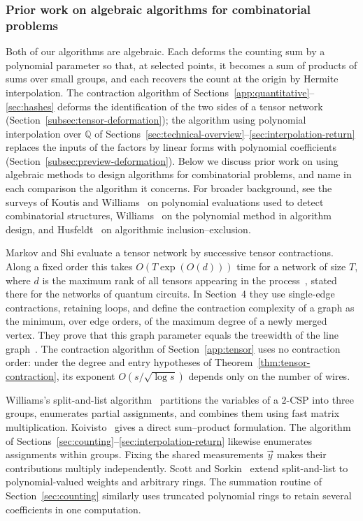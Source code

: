 \documentclass[11pt,reqno]{amsart}
\numberwithin{equation}{section}
\theoremstyle{definition}\newtheorem{definition}[theorem]{Definition}
\theoremstyle{remark}\newtheorem{remark}[theorem]{Remark}
\begin{document}
\subsubsection{Prior work on algebraic algorithms for combinatorial problems}\label{subsec:related-algebraic}
Both of our algorithms are algebraic. Each deforms the counting sum by
a polynomial parameter so that, at selected points, it becomes a sum of
products of sums over small groups, and each recovers the count at the
origin by Hermite interpolation. The contraction algorithm of
Sections~\ref{app:quantitative}--\ref{sec:hashes} deforms the
identification of the two sides of a tensor network
(Section~\ref{subsec:tensor-deformation}); the algorithm using polynomial interpolation over $\mathbb Q$ of
Sections~\ref{sec:technical-overview}--\ref{sec:interpolation-return}
replaces the inputs of the factors by linear forms with polynomial
coefficients (Section~\ref{subsec:preview-deformation}). Below we
discuss prior work on using algebraic methods to design algorithms for
combinatorial problems, and name in each comparison the algorithm it
concerns. For broader background, see the surveys of Koutis and
Williams~\cite{KW16} on polynomial evaluations used to detect combinatorial structures, Williams~\cite{Wil14}
on the polynomial method in algorithm design, and
Husfeldt~\cite{Hus11} on algorithmic inclusion--exclusion.

Markov and Shi evaluate a tensor network by successive tensor
contractions. Along a fixed order this takes $O(T\exp(O(d)))$ time
for a network of size $T$, where $d$ is the maximum rank of all
tensors appearing in the process~\cite[Proposition~3.6]{MS08}, stated
there for the networks of quantum circuits. In Section~4 they use
single-edge contractions, retaining loops, and define the contraction
complexity of a graph as the minimum, over edge orders, of the maximum
degree of a newly merged vertex. They prove that this graph parameter
equals the treewidth of the line graph~\cite[Definition~4.1 and
Proposition~4.2]{MS08}. The contraction algorithm of
Section~\ref{app:tensor} uses no contraction order: under
the degree and entry hypotheses of Theorem~\ref{thm:tensor-contraction},
its exponent $O(s/\sqrt{\log s})$ depends only on the number of wires.

Williams's split-and-list algorithm~\cite{Wil05} partitions the
variables of a $2$-CSP into three groups, enumerates partial assignments,
and combines them using fast matrix multiplication.
Koivisto~\cite{Koi06} gives a direct sum--product formulation.
The algorithm of Sections~\ref{sec:counting}--\ref{sec:interpolation-return}
likewise enumerates assignments within groups. Fixing
the shared measurements $\vec y$ makes their contributions multiply
independently. Scott and Sorkin~\cite[Section~6]{SS09} extend
split-and-list to polynomial-valued weights and arbitrary rings.
The summation routine of Section~\ref{sec:counting} similarly uses truncated polynomial rings to
retain several coefficients in one computation.
\end{document}
